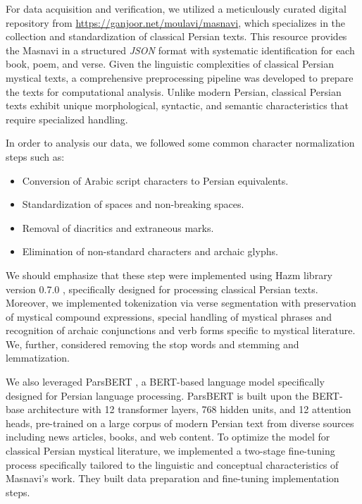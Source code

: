 \documentclass[twoside]{article}
\begin{document}
For data acquisition and verification, we utilized a meticulously curated digital repository from \url{https://ganjoor.net/moulavi/masnavi}, which specializes in the collection and standardization of classical Persian texts. This resource provides the Masnavi in a structured  \textit{JSON} format with systematic identification for each book, poem, and verse. Given the linguistic complexities of classical Persian mystical texts, a comprehensive preprocessing pipeline was developed to prepare the texts for computational analysis. Unlike modern Persian, classical Persian texts exhibit unique morphological, syntactic, and semantic characteristics that require specialized handling.

In order to analysis our data,  we followed some common character normalization steps such as:
\begin{itemize}
	\item  Conversion of Arabic script characters to Persian equivalents.
	\item  Standardization of spaces and non-breaking spaces.
	\item   Removal of diacritics and extraneous marks.
	\item Elimination of non-standard characters and archaic glyphs.
\end{itemize}
We should emphasize that  these step were  implemented using Hazm library version 0.7.0 \citep{Siavarietal:2020}, specifically designed for processing classical Persian texts. Moreover, we implemented 
tokenization via verse segmentation with preservation of mystical compound expressions, special handling of mystical phrases and recognition of archaic conjunctions and verb forms specific to mystical literature.
We, further, considered removing the stop words and stemming and lemmatization. 

We also leveraged ParsBERT \citep{Mehrdadetal:2020}, a BERT-based language model specifically designed for Persian language processing. ParsBERT is built upon the BERT-base architecture with 12 transformer layers, 768 hidden units, and 12 attention heads, pre-trained on a large corpus of modern Persian text from diverse sources including news articles, books, and web content. 
To optimize the model for classical Persian mystical literature, we implemented a two-stage fine-tuning process specifically tailored to the linguistic and conceptual characteristics of Masnavi's work. They built  
data preparation and
 fine-tuning implementation steps. 
\end{document}
